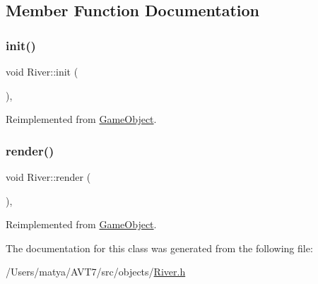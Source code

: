 \subsection{Member Function Documentation}
\mbox{\label{class_river_a34d39d986e411f957e77e85ba5719af4}} 
\subsubsection{\texorpdfstring{init()}{init()}}
{\footnotesize\ttfamily void River\+::init (\begin{DoxyParamCaption}{ }\end{DoxyParamCaption})\hspace{0.3cm}{\ttfamily [inline]}, {\ttfamily [virtual]}}



Reimplemented from \hyperlink{class_game_object_aecb2c1b9f69715d854f7604d5d7978ec}{Game\+Object}.

\mbox{\label{class_river_abf5ba1cc4356fbf57059da23e3a1997a}} 
\subsubsection{\texorpdfstring{render()}{render()}}
{\footnotesize\ttfamily void River\+::render (\begin{DoxyParamCaption}{ }\end{DoxyParamCaption})\hspace{0.3cm}{\ttfamily [inline]}, {\ttfamily [virtual]}}



Reimplemented from \hyperlink{class_game_object_a484efb66a7a27c101e84c11d9905d7a6}{Game\+Object}.



The documentation for this class was generated from the following file\+:\begin{DoxyCompactItemize}
\item 
/\+Users/matya/\+A\+V\+T7/src/objects/\hyperlink{_river_8h}{River.\+h}\end{DoxyCompactItemize}
